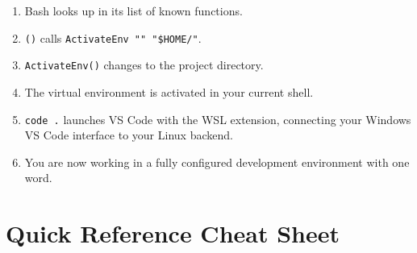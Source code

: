 \begin{enumerate}
  \item Bash looks up \texttt{\ProjectName{}} in its list of known functions.
  \item \texttt{\ProjectName{}()} calls \texttt{ActivateEnv "\ProjectName{}" "\$HOME/\ProjectName{}"}.
  \item \texttt{ActivateEnv()} changes to the project directory.
  \item The virtual environment is activated in your current shell.
  \item \texttt{code .} launches VS Code with the WSL extension,
        connecting your Windows VS Code interface to your Linux backend.
  \item You are now working in a fully configured development environment
        with one word.
\end{enumerate}

\section{Quick Reference Cheat Sheet}
\label{sec:cheatsheet}

